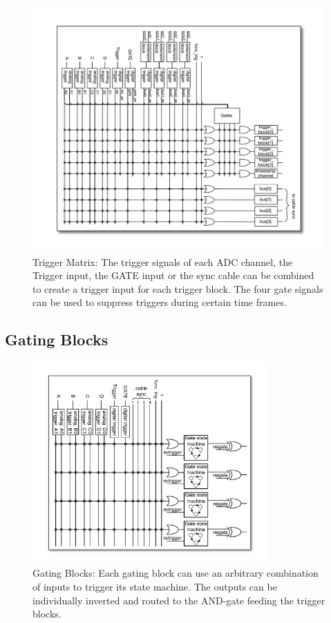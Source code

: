 \begin{figure}
    \centering
    \includegraphics[width=\textwidth]{figures/triggermatrix.pdf}
    \caption{Trigger Matrix: The trigger signals of each ADC channel, the Trigger input, the GATE input or the sync cable can be combined to create a trigger input for each trigger block.  The four gate signals can be used to suppress triggers during certain time frames.\label{fig:triggermatrix}}
\end{figure}
    
\subsection{Gating Blocks}
        
        \begin{figure}[ht]
            \begin{center}
                \includegraphics[width=0.8\textwidth]{figures/GatingBlocks.pdf}
                \caption{\label{fig:GatingBlock} Gating Blocks: Each gating block can use an arbitrary combination of inputs to trigger its state machine. The outputs can be individually inverted and routed to the AND-gate feeding the trigger blocks.}
            \end{center}
        \end{figure}
        
